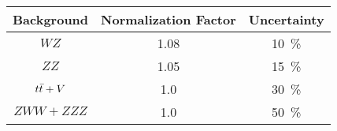     \begin{tabular}{|c|cc|}
    \hline
    Background & Normalization Factor & Uncertainty \\ 
    \hline\hline
    $WZ$ & 1.08 & 10~\% \\
    $ZZ$ & 1.05 & 15~\% \\
    $t\bar{t} +V$ & 1.0 & 30~\% \\
    $ZWW+ZZZ$ & 1.0 & 50~\% \\
    \hline
  \end{tabular}
  
